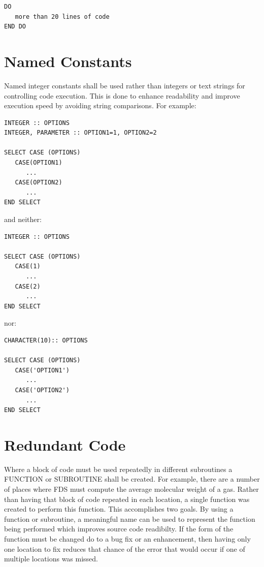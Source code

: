 \documentclass[11pt]{book}
\newcommand{\nopart}{\expandafter\def\csname Parent-1\endcsname{}} %
\begin{document}
\begin{verbatim}
DO 
   more than 20 lines of code
END DO
\end{verbatim}

\section{Named Constants}

Named integer constants shall be used rather than integers or text strings for controlling code execution.  This
is done to enhance readability and improve execution speed by avoiding string comparisons.  For example:

\begin{verbatim}
INTEGER :: OPTIONS
INTEGER, PARAMETER :: OPTION1=1, OPTION2=2

SELECT CASE (OPTIONS) 
   CASE(OPTION1)
      ...
   CASE(OPTION2)
      ...
END SELECT
\end{verbatim}

and neither:
\begin{verbatim}
INTEGER :: OPTIONS

SELECT CASE (OPTIONS) 
   CASE(1)
      ...
   CASE(2)
      ...
END SELECT
\end{verbatim}

nor:
\begin{verbatim}
CHARACTER(10):: OPTIONS

SELECT CASE (OPTIONS) 
   CASE('OPTION1')
      ...
   CASE('OPTION2')
      ...
END SELECT
\end{verbatim}

\section{Redundant Code}

Where a block of code must be used repeatedly in different subroutines a {\ct FUNCTION} or {\ct SUBROUTINE}
shall be created.  For example, there are a number of places where FDS must compute the average molecular weight
of a gas.  Rather than having that block of code repeated in each location, a single function was created to
perform this function.  This accomplishes two goals.  By using a function or subroutine, a meaningful name can
be used to represent the function being performed which improves source code readibilty.  If the form of the
function must be changed do to a bug fix or an enhancement, then having only one location to fix reduces that
chance of the error that would occur if one of multiple locations was missed.

\backmatter
\nopart %



\printindex
\end{document}
